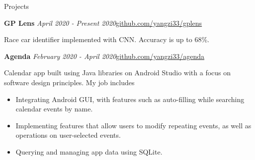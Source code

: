 \documentclass{resume} %
\begin{document}
\begin{rSection}{Projects}
\begin{rSubsection}
{\bf GP Lens }{\it April 2020 - Present 2020}{\href{https://github.com/yangzi33/gplens}{github.com/yangzi33/gplens}}{}
\item
Race car identifier implemented with CNN. Accuracy is up to 68\%.
\end{rSubsection}
\begin{rSubsection}
{\bf Agenda }{\it February 2020 - April 2020}{\href{https://github.com/yangzi33/agenda}{github.com/yangzi33/agenda}}{}
\item
Calendar app built using Java libraries on Android Studio with a focus on software design principles. My job includes
\begin{itemize}
    \item Integrating Android GUI, with features such as 
    auto-filling while searching calendar events by name.
    \item Implementing features that allow users to modify
    repeating events, as well as operations on user-selected events.
    \item Querying and managing app data using SQLite.
\end{itemize}
\end{rSubsection}


\end{rSection}
\end{document}
